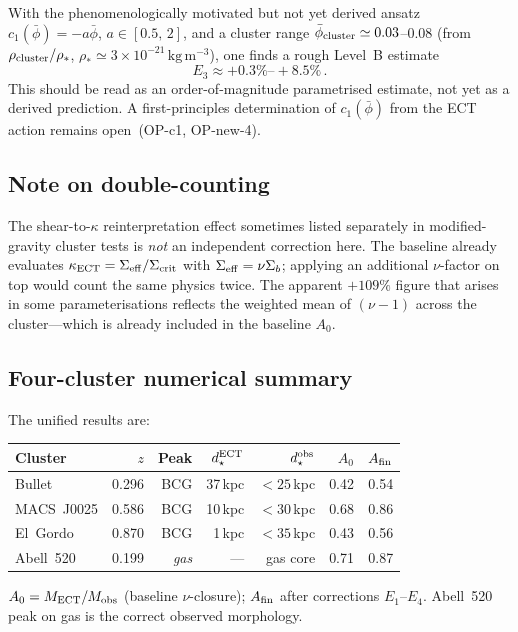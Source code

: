 \documentclass[11pt,a4paper]{article}
\numberwithin{equation}{section}
\begin{document}
With the phenomenologically motivated but not yet derived ansatz
$c_1(\bar\phi)=-a\bar\phi$, $a\in[0.5,\,2]$, and a cluster range
$\bar\phi_{\rm cluster}\simeq0.03$--$0.08$
(from $\rho_{\rm cluster}/\rho_*$,
$\rho_*\simeq3\times10^{-21}\,\mathrm{kg\,m^{-3}}$),
one finds a rough Level~B estimate
\begin{equation}
  E_3 \approx +0.3\%\text{--}+8.5\%\,.
\end{equation}
This should be read as an order-of-magnitude parametrised estimate,
not yet as a derived prediction.
A first-principles determination of $c_1(\bar\phi)$ from the ECT
action remains open~(OP-c1, OP-new-4).

\subsection{Note on double-counting}
\label{app:cluster_doublecounting}

The shear-to-$\kappa$ reinterpretation effect sometimes listed
separately in modified-gravity cluster tests is \emph{not} an
independent correction here.
The baseline already evaluates
$\kappa_{\rm ECT}=\Sigma_{\rm eff}/\Sigma_{\rm crit}$ with
$\Sigma_{\rm eff}=\nu\Sigma_b$; applying an additional $\nu$-factor
on top would count the same physics twice.
The apparent $+109\%$ figure that arises in some parameterisations
reflects the weighted mean of $(\nu-1)$ across the cluster---which
is already included in the baseline $A_0$.

\subsection{Four-cluster numerical summary}
\label{app:cluster_numerical}

The unified results are:

\begin{center}
\small
\begin{tabular}{lrrrrrr}
\toprule
Cluster & $z$ & Peak & $d_\star^{\rm ECT}$ & $d_\star^{\rm obs}$ &
  $A_0$ & $A_{\rm fin}$ \\
\midrule
Bullet     & 0.296 & BCG  & 37\,kpc & $<25$\,kpc & 0.42 & 0.54 \\
MACS~J0025 & 0.586 & BCG  & 10\,kpc & $<30$\,kpc & 0.68 & 0.86 \\
El~Gordo   & 0.870 & BCG  &  1\,kpc & $<35$\,kpc & 0.43 & 0.56 \\
Abell~520  & 0.199 & \textit{gas} & --- & gas core & 0.71 & 0.87 \\
\bottomrule
\end{tabular}
\end{center}
$A_0 = M_{\rm ECT}/M_{\rm obs}$ (baseline $\nu$-closure);
$A_{\rm fin}$ after corrections $E_1$--$E_4$.
Abell~520 peak on gas is the correct observed morphology.
\end{document}
